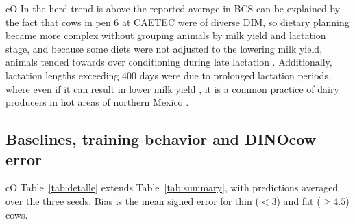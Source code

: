
\begin{marca}{cO}
In  the herd trend is above the reported average in BCS can be explained by the fact that cows in pen 6 at CAETEC were of diverse DIM, so dietary planning became more complex without grouping animals by milk yield and lactation stage, and because some  diets were not adjusted to the lowering milk yield, animals tended towards over conditioning during late lactation \citep{schroder2006}.
Additionally, lactation lengths exceeding 400 days were due to prolonged lactation periods, where even if it can result in lower milk yield \citep{jukna2024}, it is a common practice of dairy producers in hot areas of northern Mexico \citep{mellado2016}.
\end{marca}

\subsection*{Baselines, training behavior and DINOcow error}

\begin{marca}{cO}
Table~\ref{tab:detalle} extends Table~\ref{tab:summary}, with predictions averaged over the three seeds. Bias is the mean signed error for thin ($<3$) and fat ($\geq4.5$) cows.
\end{marca}

